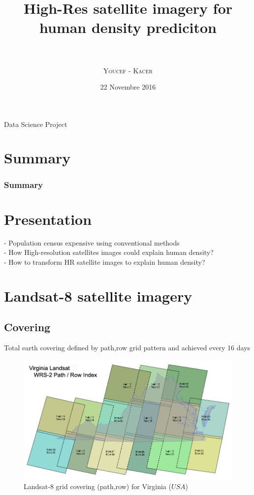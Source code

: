 \documentclass{beamer}
\title{%
  High-Res satellite imagery for human density prediciton\\
  \large \\
    }
\author{\textsc{Youcef} - \textsc{Kacer}}
\date{22 Novembre 2016}
\begin{document}
\begin{frame}
Data Science Project
\end{frame}
\section{Summary}
\begin{frame}
\frametitle{Summary}
\end{frame}

\section{Presentation}

\begin{frame}
- Population census expensive using conventional methods\\
- How High-resolution satellites images could explain human density?\\
- How to transform HR satellite images to explain human density?\\
\end{frame}

\section{Landsat-8 satellite imagery}
\subsection{Covering}

\begin{frame}
Total earth covering defined by path,row grid pattern and achieved every 16 days
\begin{figure}
  \includegraphics[scale=0.13]{images/covering/wrs.png}
  \caption{Landsat-8 grid covering (path,row) for Virginia ($USA$) }
\end{figure}
\end{frame}
\end{document}

